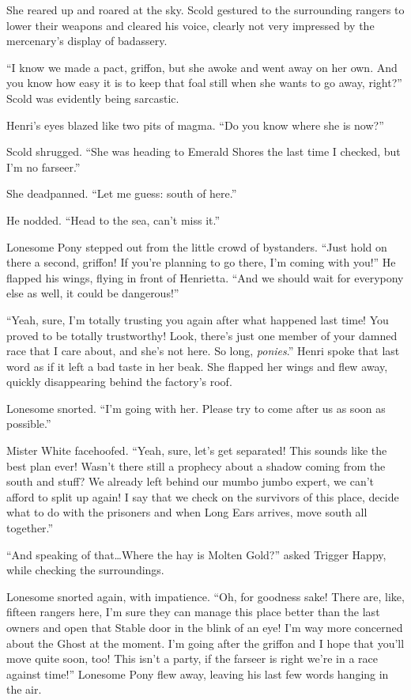 She reared up and roared at the sky. Scold gestured to the surrounding rangers to lower their weapons and cleared his voice, clearly not very impressed by the mercenary's display of badassery.

``I know we made a pact, griffon, but she awoke and went away on her own. And you know how easy it is to keep that foal still when she wants to go away, right?'' Scold was evidently being sarcastic.

Henri's eyes blazed like two pits of magma. ``Do you know where she is now?''

Scold shrugged. ``She was heading to Emerald Shores the last time I checked, but I'm no farseer.''

She deadpanned. ``Let me guess: south of here.''

He nodded. ``Head to the sea, can't miss it.''

Lonesome Pony stepped out from the little crowd of bystanders. ``Just hold on there a second, griffon! If you're planning to go there, I'm coming with you!'' He flapped his wings, flying in front of Henrietta. ``And we should wait for everypony else as well, it could be dangerous!''

``Yeah, sure, I'm totally trusting you again after what happened last time! You proved to be totally trustworthy! Look, there's just one member of your damned race that I care about, and she's not here. So long, \emph{ponies}.'' Henri spoke that last word as if it left a bad taste in her beak. She flapped her wings and flew away, quickly disappearing behind the factory's roof.

Lonesome snorted. ``I'm going with her. Please try to come after us as soon as possible.''

Mister White facehoofed. ``Yeah, sure, let's get separated! This sounds like the best plan ever! Wasn't there still a prophecy about a shadow coming from the south and stuff? We already left behind our mumbo jumbo expert, we can't afford to split up again! I say that we check on the survivors of this place, decide what to do with the prisoners and when Long Ears arrives, move south all together.''

``And speaking of that\dots Where the hay is Molten Gold?'' asked Trigger Happy, while checking the surroundings.

Lonesome snorted again, with impatience. ``Oh, for goodness sake! There are, like, fifteen rangers here, I'm sure they can manage this place better than the last owners and open that Stable door in the blink of an eye! I'm way more concerned about the Ghost at the moment. I'm going after the griffon and I hope that you'll move quite soon, too! This isn't a party, if the farseer is right we're in a race against time!'' Lonesome Pony flew away, leaving his last few words hanging in the air.



